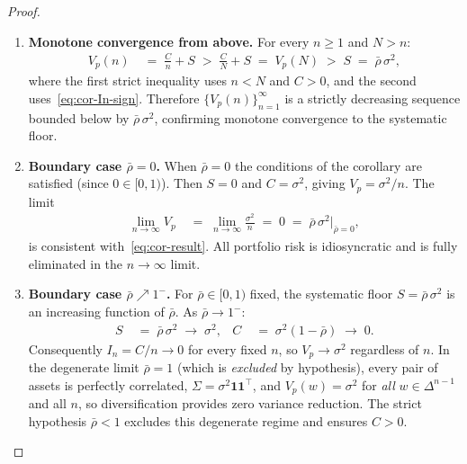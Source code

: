 \documentclass[12pt,openany]{book}
\newcommand{\bfw}{\mathbf{w}}
\numberwithin{equation}{chapter}
\theoremstyle{plain}
\theoremstyle{definition}
\theoremstyle{remark}
\def\bfw{w}%
\begin{document}
\begin{proof}
\begin{enumerate}
  \item \textbf{Monotone convergence from above.}
        For every $n \geq 1$ and $N > n$:
        \begin{align}
          V_p(n)
          &\;=\;
            \frac{C}{n} + S
          \;>\;
            \frac{C}{N} + S
          \;=\;
            V_p(N)
          \;>\;
            S
          \;=\;
            \bar{\rho}\,\sigma^2,
          \label{eq:cor-mono}
        \end{align}
        where the first strict inequality uses $n < N$ and $C > 0$,
        and the second uses~\eqref{eq:cor-In-sign}.
        Therefore $\{V_p(n)\}_{n=1}^{\infty}$ is a strictly
        decreasing sequence bounded below by $\bar{\rho}\,\sigma^2$,
        confirming monotone convergence to the systematic floor.

  \item \textbf{Boundary case $\bar{\rho} = 0$.}
        When $\bar{\rho} = 0$ the conditions of the corollary are
        satisfied (since $0 \in [0,1)$).  Then $S = 0$ and
        $C = \sigma^2$, giving $V_p = \sigma^2/n$.  The limit
        \begin{align}
          \lim_{n \to \infty} V_p
          &\;=\;
            \lim_{n \to \infty} \frac{\sigma^2}{n}
          \;=\;
            0
          \;=\;
            \bar{\rho}\,\sigma^2\big|_{\bar{\rho}=0},
          \label{eq:cor-rho0}
        \end{align}
        is consistent with~\eqref{eq:cor-result}.  All portfolio
        risk is idiosyncratic and is fully eliminated in the
        $n \to \infty$ limit.

  \item \textbf{Boundary case $\bar{\rho} \nearrow 1^-$.}
        For $\bar{\rho} \in [0,1)$ fixed, the systematic floor
        $S = \bar{\rho}\,\sigma^2$ is an increasing function of
        $\bar{\rho}$.  As $\bar{\rho} \to 1^-$:
        \begin{align}
          S
          &\;=\;
            \bar{\rho}\,\sigma^2
          \;\longrightarrow\;
            \sigma^2,
          &
          C
          &\;=\;
            \sigma^2(1-\bar{\rho})
          \;\longrightarrow\;
            0.
          \label{eq:cor-rho1}
        \end{align}
        Consequently $I_n = C/n \to 0$ for every fixed $n$, so
        $V_p \to \sigma^2$ regardless of $n$.  In the degenerate
        limit $\bar{\rho} = 1$ (which is \emph{excluded} by
        hypothesis), every pair of assets is perfectly correlated,
        $\Sigma = \sigma^2 \mathbf{1}\mathbf{1}^\top$, and
        $V_p(\bfw) = \sigma^2$ for \emph{all} $\bfw \in \Delta^{n-1}$
        and all $n$, so diversification provides zero variance
        reduction.  The strict hypothesis $\bar{\rho} < 1$ excludes
        this degenerate regime and ensures $C > 0$.


\end{enumerate}
\end{proof}
\end{document}
